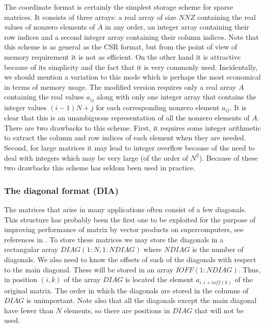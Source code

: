 \documentclass[12pt]{article}
\begin{document}
The coordinate format is certainly the simplest storage scheme for
sparse matrices. It consists of three arrays: a real array of size
$NNZ$ containing the real values of nonzero elements of $A$ in any
order, an integer array containing their row indices and a second
integer array containing their column indices. Note that this scheme
is as general as the CSR format, but from the point of view of memory
requirement it is not as efficient.  On the other hand it is
attractive because of its simplicity and the fact that it is very
commonly used.  Incidentally, we should mention a variation to this
mode which is perhaps the most economical in terms of memory usage.
The modified version requires only a real array $A$ containing the
real values $a_{ij}$ along with only one integer array that contains
the integer values $ (i-1)N + j$ for each corresponding nonzero
element $a_{ij}$.  It is clear that this is an unambiguous
representation of all the nonzero elements of $A$.  There are two
drawbacks to this scheme. First, it requires some integer arithmetic
to extract the column and row indices of each element when they are
needed. Second, for large matrices it may lead to integer overflow
because of the need to deal with integers which may be very large (of
the order of $N^2$).  Because of these two drawbacks this scheme has
seldom been used in practice.

\subsubsection{The diagonal format (DIA) }
The matrices that arise in many applications often consist of a few
diagonals. This structure has probably been the first one to be
exploited for the purpose of improving performance of
matrix by vector products on supercomputers, see references in
\cite{Saad-Boeing}.  To store
these matrices we may store the diagonals in a rectangular array
$DIAG(1:N,1:NDIAG) $ where $NDIAG$ is the number of diagonals.  We
also need to know the offsets of each of the diagonals with respect to
the main diagonal. These will be stored in an array $IOFF(1:NDIAG)$.
Thus, in position $(i,k)$ of the array $DIAG$ is located the element
$a_{i,i+ioff(k)}$ of the original matrix.  The order in which the
diagonals are stored in the columns of $DIAG$ is unimportant.  Note
also that all the diagonals except the main diagonal have fewer than
$N$ elements, so there are positions in $DIAG$ that will not be used.
\end{document}
